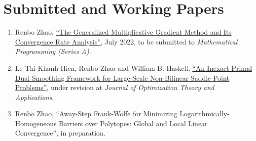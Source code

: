 \documentclass[11pt]{article}
\newcommand{\MPA}{Mathematical Programming (Series A)}
\newcommand{\JOTA}{Journal of Optimization Theory and Applications}
\begin{document}


\section*{\large Submitted and Working Papers}%

\begin{enumerate}[label=W\arabic*.]\setlength{\leftskip}{2ex}
\item Renbo Zhao, \href{https://arxiv.org/abs/2207.13198}{``The Generalized Multiplicative Gradient Method and Its Convergence Rate Analysis''}, July 2022, to be submitted to {\em \MPA}.
\item Le Thi Khanh Hien, {Renbo Zhao} and William B. Haskell, \href{https://arxiv.org/abs/1711.03669}{``An Inexact Primal Dual Smoothing Framework for Large-Scale Non-Bilinear Saddle Point Problems''}, under revision at {\em \JOTA}.
\item Renbo Zhao, ``Away-Step Frank-Wolfe for Minimizing Logarithmically-Homogeneous Barriers over Polytopes: Global and Local Linear Convergence'', in preparation. 
\end{enumerate}


\end{document}
